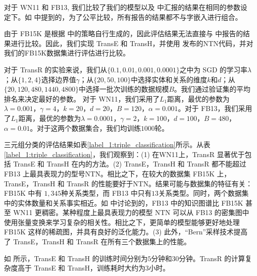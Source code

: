     对于 WN11 和 FB13, 我们比较了我们的模型以及 \cite{wang2014knowledge} 中汇报的结果在相同的参数设定下。如 \cite{wang2014knowledge} 中提到的，为了公平比较，所有报告的结果都不与字嵌入进行组合。

    由于 FB15K 是根据 \cite{socher2013reasoning} 中的策略自行生成的，因此评估结果无法直接与 \cite{wang2014knowledge} 中报告的结果进行比较。因此，我们实现 TransE 和 TransH，并使用 \cite{socher2013reasoning} 发布的NTN代码，并对我们的FB15K数据集进行评估进行比较。

    对于 TransR 的实验来说，我们从$\{0.1, 0.01, 0.001, 0.0001\}$之中为 SGD 的学习率$\lambda$；从$\{1, 2, 4\}$选择边界值$\gamma$；从$\{20,50,100\}$中选择实体和关系的维度$k$和$d$；从$\{20, 120, 480, 1440, 4800\}$中选择一批次训练的数据规模$B$。我们通过验证集的平均排名来决定最好的参数。
    对于 WN11，我们采用了$L_1$距离，最优的参数为$\lambda = 0.001$，$\gamma= 4$，$k = 20$，$d = 20$，$B = 120$，$\alpha=0.001$。对于 FB13，我们采用了$L_1$距离，最优的参数为$\lambda = 0.0001$，$\gamma = 2$，$k = 100$，$d = 100$，$B = 480$，$\alpha=0.01$。对于这两个数据集合，我们均训练$1000$轮。

    三元组分类的评估结果如表\ref{label_1:triple_classification}所示。从表\ref{label_1:triple_classification}，我们观察到：(1) 在WN11上，TransR 显著优于包括 TransE 和 TransH 在内的方法。(2) TransE，TransH 和 TransR 都不能超过 FB13 上最具表现力的型号NTN。相比之下，在较大的数据集 FB15K 上，TransE，TransH 和 TransR 的性能要好于NTN。结果可能与数据集的特征有关：FB15K 中有 $1,345$种关系类型，而 FB13 中只有$13$关系类型。同时，两个数据集中的实体数量和关系事实相近。如 \cite{wang2014knowledge} 中讨论到的，FB13 中的知识图谱比 FB15K 甚至 WN11 更稠密。某种程度上最具表现力的模型 NTN 可以从 FB13 的密集图中使用张量变换来学习复杂的相关性。相比之下，更简单的模型能够更好地处理 FB15K 这样的稀疏图，并具有良好的泛化能力。(3) 此外，``Bern''采样技术提高了 TransE，TransH 和 TransR 在所有三个数据集上的性能。

    如 \cite{wang2014knowledge} 所示，TransE 和 TransH 的训练时间分别为$5$分钟和$30$分钟。TransR 的计算复杂度高于 TransE 和 TransH，训练耗时大约为$3$小时。

